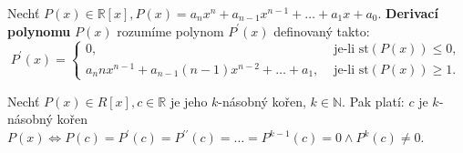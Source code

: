 \begin{definition}
    Nechť $P(x) \in \mathbb R[x], P(x)=a_nx^n+a_{n-1}x^{n-1}+\dots+a_1x+a_0.$ \textbf{Derivací polynomu} $P(x)$ rozumíme polynom $P^\prime(x)$ definovaný takto:
    $$
        P^\prime(x)=\begin{cases}
        0, &\text{ je-li st} (P(x)) \leq 0,\\
        a_n n x^{n-1} + a_{n-1}(n-1)x^{n-2} + \dots + a_1, & \text{ je-li st} (P(x)) \geq 1.
        \end{cases}
    $$
\end{definition}

\begin{veta}
    Nechť $P(x) \in R[x], c \in \mathbb R$ je jeho $k$-násobný kořen, $k\in \mathbb N.$ Pak platí: $c$ je
    $k$-násobný kořen $P(x) \iff P(c)=P^\prime(c)=P^{\prime \prime}(c)=\dots= P^{k-1}(c)=0 \land P^{k}(c)\ne 0$.
\end{veta}
